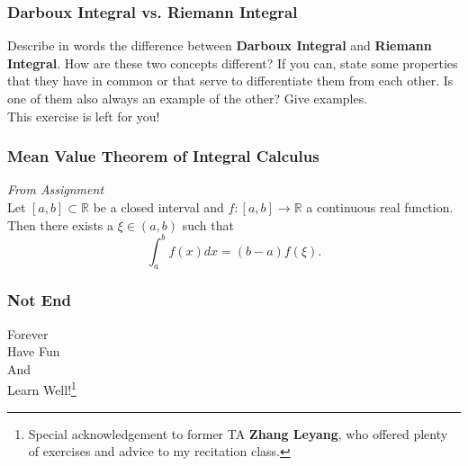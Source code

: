 \documentclass[10pt, t]{beamer}
\newcommand{\R}{\mathbb{R}}
\newcommand{\nullspace}{~\\[15pt]}
\begin{document}
\begin{frame}
    \frametitle{Darboux Integral vs. Riemann Integral}
    Describe in words the difference between \textbf{Darboux Integral} and \textbf{Riemann Integral}. How are these two concepts different? If you can, state some properties that they have in common or that serve to differentiate them from each other. Is one of them also always an example of the other? Give examples.
    \nullspace
    This exercise is left for you!
\end{frame}

\begin{frame}
    \frametitle{Mean Value Theorem of Integral Calculus}

    \textit{From Assignment}\nullspace

    Let $[a,b]\subset\R$ be a closed interval and $f:[a,b]\to\R$ a continuous real function. Then there exists a $\xi \in (a,b)$ such that
    $$\int_a^bf(x)dx=(b-a)f(\xi).$$

\end{frame}

\begin{frame}
    \frametitle{Not End}
    \vspace{1cm}
    \begin{center}
        \LARGE
        Forever\\
        Have Fun \\
        And \\
        Learn Well!\footnote[frame]{Special acknowledgement to former TA \textbf{Zhang Leyang}, who offered plenty of exercises and advice to my recitation class.}
    \end{center}
\end{frame}
\end{document}
